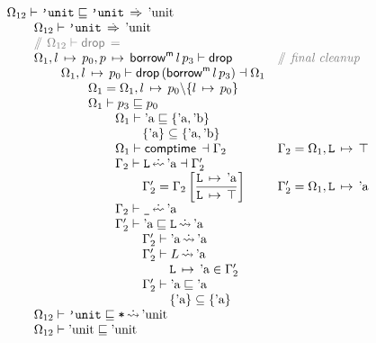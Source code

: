 \documentclass[12pt,twoside]{report}
\begin{document}
{\[\begin{array}{lll}
    \Omega_{12} \vdash \mono{'unit} \subtype \mono{'unit} \movearrowabs \atom{unit} \\
    \otab\Omega_{12} \vdash \mono{'unit} \movearrowabs \atom{unit} \\
    \otab\ocomment{$\Omega_{12} \vdash \drop{} =$} \\
    \otab\Omega_1,\absmap{l}{p_0},\absmap{p}{\borrowm{l}{p_3}} \vdash \drop{} &
      \ocomment{final cleanup} \\
    \otab\otab \Omega_1,\absmap{l}{p_0} \vdash \drop{(\borrowm{l}{p_3})} \dashv \Omega_1 \\
    \otab\otab\otab \Omega_1 = \Omega_1,\absmap{l}{p_0} \backslash \{ \absmap{l}{p_0} \} \\
    \otab\otab\otab \Omega_1 \vdash p_3 \subtype p_0 \\
    \otab\otab\otab\otab \Omega_1 \vdash \atom{a} \subtype \{\atom{a}, \atom{b}\} \\
    \otab\otab\otab\otab\otab \{\atom{a}\} \subseteq \{\atom{a}, \atom{b}\} \\
    \otab\otab\otab\otab \Omega_1 \vdash \comptime{} \dashv \Gamma_2 &
      \Gamma_2 = \Omega_1,\absmapm{L}{\top} \\
    \otab\otab\otab\otab \Gamma_2 \vdash \mono{L} \erasedwritearrow \atom{a} \dashv \Gamma_2' \\
    \otab\otab\otab\otab\otab \Gamma_2' = \Gamma_2\left[\dfrac{\absmapm{L}{\atom{a}}}{\absmapm{L}{\top}}\right] &
       \Gamma_2' = \Omega_1,\absmapm{L}{\atom{a}} \\
    \otab\otab\otab\otab \Gamma_2 \vdash \mono{\_} \erasedwritearrow \atom{a} \\
    \otab\otab\otab\otab \Gamma_2' \vdash \atom{a} \subtype \mono{L} \erasedreadarrow \atom{a} \\
    \otab\otab\otab\otab\otab \Gamma_2' \vdash \atom{a} \erasedreadarrow \atom{a} \\
    \otab\otab\otab\otab\otab \Gamma_2' \vdash L \erasedreadarrow \atom{a} \\
    \otab\otab\otab\otab\otab\otab \absmapm{L}{\atom{a}} \in \Gamma_2' \\
    \otab\otab\otab\otab\otab \Gamma_2' \vdash \atom{a} \subtype \atom{a} \\
    \otab\otab\otab\otab\otab\otab \{\atom{a}\} \subseteq \{\atom{a}\} \\
    \otab\Omega_{12} \vdash \mono{'unit} \subtype \mono{*} \erasedreadarrow \atom{unit} \\
    
    \otab \Omega_{12} \vdash \atom{unit} \subtype \atom{unit}
  \end{array}\]
}
\end{document}
